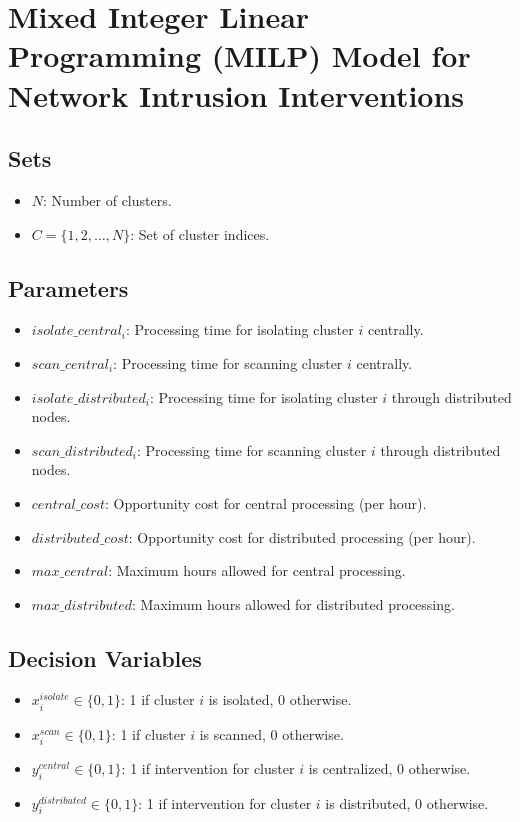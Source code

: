 \documentclass{article}
\begin{document}
\section*{Mixed Integer Linear Programming (MILP) Model for Network Intrusion Interventions}

\subsection*{Sets}
\begin{itemize}
    \item $N$: Number of clusters.
    \item $C = \{1, 2, \ldots, N\}$: Set of cluster indices.
\end{itemize}

\subsection*{Parameters}
\begin{itemize}
    \item $isolate\_central_i$: Processing time for isolating cluster $i$ centrally.
    \item $scan\_central_i$: Processing time for scanning cluster $i$ centrally.
    \item $isolate\_distributed_i$: Processing time for isolating cluster $i$ through distributed nodes.
    \item $scan\_distributed_i$: Processing time for scanning cluster $i$ through distributed nodes.
    \item $central\_cost$: Opportunity cost for central processing (per hour).
    \item $distributed\_cost$: Opportunity cost for distributed processing (per hour).
    \item $max\_central$: Maximum hours allowed for central processing.
    \item $max\_distributed$: Maximum hours allowed for distributed processing.
\end{itemize}

\subsection*{Decision Variables}
\begin{itemize}
    \item $x_{i}^{isolate} \in \{0, 1\}$: 1 if cluster $i$ is isolated, 0 otherwise.
    \item $x_{i}^{scan} \in \{0, 1\}$: 1 if cluster $i$ is scanned, 0 otherwise.
    \item $y_{i}^{central} \in \{0, 1\}$: 1 if intervention for cluster $i$ is centralized, 0 otherwise.
    \item $y_{i}^{distributed} \in \{0, 1\}$: 1 if intervention for cluster $i$ is distributed, 0 otherwise.
\end{itemize}
\end{document}
